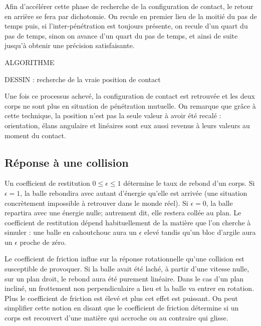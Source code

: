 Afin d'accélérer cette phase de recherche de la configuration de contact, le retour en arrière se fera par dichotomie. On recule en premier lieu de la moitié du pas de temps puis, si l'inter-pénétration est toujours présente, on recule d'un quart du pas de temps, sinon on avance d'un quart du pas de temps, et ainsi de suite jusqu'à obtenir une précision satisfaisante.

ALGORITHME

DESSIN : recherche de la vraie position de contact

Une fois ce processus achevé, la configuration de contact est retrouvée et les deux corps ne sont plus en situation de pénétration mutuelle. On remarque que grâce à cette technique, la position n'est pas la seule valeur à avoir été recalé : orientation, élans angulaire et linéaires sont eux aussi revenus à leurs valeurs au moment du contact.

\subsection{Réponse à une collision}

Un coefficient de restitution $0 \leq \epsilon \leq 1$ détermine le taux de rebond d'un corps. Si $\epsilon = 1$, la balle rebondira avec autant d'énergie qu'elle est arrivée (une situation concrètement impossible à retrouver dans le monde réel). Si $\epsilon = 0$, la balle repartira avec une énergie nulle; autrement dit, elle restera collée au plan. Le coefficient de restitution dépend habituellement de la matière que l'on cherche à simuler : une balle en cahoutchouc aura un $\epsilon$ elevé tandis qu'un bloc d'argile aura un $\epsilon$ proche de zéro.

Le coefficient de friction influe sur la réponse rotationnelle qu'une collision est susceptible de provoquer. Si la balle avait été laché, à partir d'une vitesse nulle, sur un plan droit, le rebond aura été purement linéaire. Dans le cas d'un plan incliné, un frottement non perpendiculaire a lieu et la balle va entrer en rotation. Plus le coefficient de friction est élevé et plus cet effet est puissant. On peut simplifier cette notion en disant que le coefficient de friction détermine si un corps est recouvert d'une matière qui accroche ou au contraire qui glisse.

\cite{newton87}

